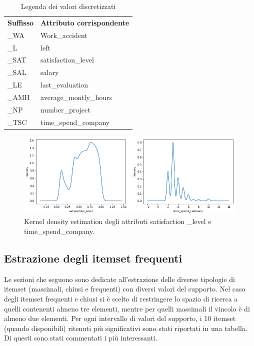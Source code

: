 \documentclass[a4paper]{article}
\begin{document}
\begin{table}[h]
\centering
\begingroup
\setlength{\tabcolsep}{10pt} %
\renewcommand{\arraystretch}{1.5} %
\begin{tabularx}{\textwidth}{|X|X|}
\hline
{\textbf{Suffisso}} & {\textbf{Attributo corrispondente}} \\
\_WA & Work\_accident \\
\_L & left \\
\_SAT & satisfaction\_level \\
\_SAL & salary \\
\_LE & last\_evaluation \\
\_AMH & average\_montly\_hours \\
\_NP & number\_project \\
\_TSC & time\_spend\_company \\
\hline
\end{tabularx}
\endgroup
\caption{Legenda dei valori discretizzati}
\label{tab:legend}
\end{table}

\begin{figure}
\center
\includegraphics[width=0.9\linewidth]{numerical_feat_distributions_new.png}

\caption{Kernel density estimation degli attributi satisfaction
\_level e time\_spend\_company.}
\label{fig:kdes}
\end{figure}


\subsection{Estrazione degli itemset frequenti}

Le sezioni che seguono sono dedicate all'estrazione delle diverse tipologie di itemset (massimali, chiusi e frequenti) con diversi valori del supporto. Nel caso degli itemset frequenti e chiusi si è scelto di restringere lo spazio di ricerca a quelli contenenti almeno tre elementi, mentre per quelli massimali il vincolo è di almeno due elementi. 
Per ogni intervallo di valori del supporto, i 10 itemset (quando disponibili) ritenuti più significativi sono stati riportati in una tabella. Di questi sono stati commentati i più interessanti.
\end{document}
